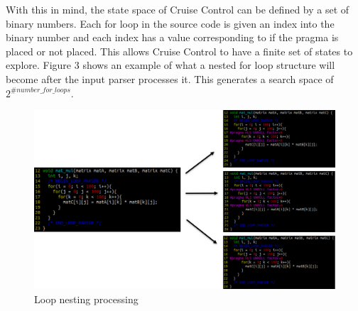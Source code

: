 \documentclass[letterpaper, 10 pt, conference]{IEEEconf}  %
\begin{document}
With this in mind, the state space of Cruise Control can be defined by a set of binary numbers. Each for loop in the source code is given an index into the binary number and each index has a value corresponding to if the pragma is placed or not placed. This allows Cruise Control to have a finite set of states to explore. Figure 3 shows an example of what a nested for loop structure will become after the input parser processes it. This generates a search space of $2^{\#number\_for\_loops}$. \newline

\begin{figure}[H]
\centering
\includegraphics[scale=.3]{for_loops.png} 
\caption{Loop nesting processing}
\end{figure}
\end{document}
